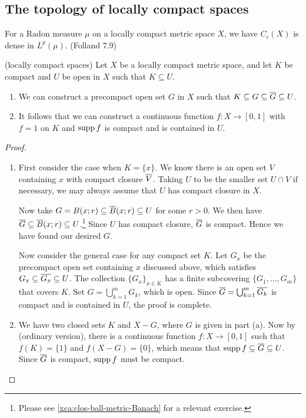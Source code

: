 \subsection{The topology of locally compact spaces}

For a Radon measure $\mu$ on a locally compact metric space $X$, we have $C_c(X)$ is dense in $L^p(\mu)$. (Folland 7.9)

\begin{namedthm} (locally compact spaces) \label{thm:Urysohn-local-compact}
    Let $X$ be a locally compact metric space, and let $K$ be compact and $U$ be open in $X$ such that $K \subseteq U$.
    \begin{enumerate}
        \item \label{enu:precompact-in-between} We can construct a precompact open set $G$ in $X$ such that $K \subseteq G \subseteq \overline{G} \subseteq U$.
        \item \label{enu:bump-function} It follows that we can construct a continuous function $f\colon X \to [0,1]$ with $f = 1$ on $K$ and $\operatorname{supp} f$ is compact and is contained in $U$.
    \end{enumerate}
\end{namedthm}
\begin{proof}
    \leavevmode \begin{enumerate}
        \item First consider the case when $K = \{x\}$. We know there is an open set $V$ containing $x$ with compact closure $\overline{V}$. Taking $U$ to be the smaller set $U \cap V$ if necessary, we may always assume that $U$ has compact closure in $X$.

        Now take $G = B(x;r) \subseteq \overline{B}(x;r) \subseteq U$ for some $r > 0$. We then have $\overline{G} \subseteq \overline{B}(x;r) \subseteq U$.\footnote{Please see \cref{xca:clos-ball-metric-Banach} for a relevant exercise.} Since $U$ has compact closure, $\overline{G}$ is compact. Hence we have found our desired $G$.

        Now consider the general case for any compact set $K$. Let $G_x$ be the precompact open set containing $x$ discussed above, which satisfies $G_x \subseteq \overline{G_x} \subseteq U$. The collection $\{G_x\}_{x \in K}$ has a finite subcovering $\{G_1,\dotsc,G_m\}$ that covers $K$. Set $G = \bigcup_{k=1}^m G_k$, which is open. Since $\overline{G} = \bigcup_{k=1}^m \overline{G_k}$ is compact and is contained in $U$, the proof is complete.
        \item We have two closed sets $K$ and $X - G$, where $G$ is given in part (a). Now by  (ordinary version), there is a continuous function $f\colon X \to [0,1]$ such that $f(K) = \{1\}$ and $f(X - G) = \{0\}$, which means that $\operatorname{supp} f \subseteq \overline{G} \subseteq U$. Since $\overline{G}$ is compact, $\operatorname{supp} f$ must be compact.
        \qedhere
    \end{enumerate}
\end{proof}

